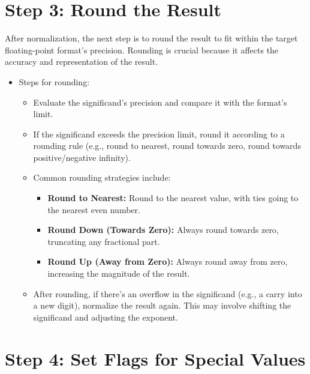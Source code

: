 \documentclass[12pt,openany]{book}
\begin{document}
			      	\section*{Step 3: Round the Result}
			      	
			      	After normalization, the next step is to round the result to fit within the target floating-point format's precision. Rounding is crucial because it affects the accuracy and representation of the result.
			      	    
			      	\begin{itemize}
			      		\item[] Steps for rounding:
			      		      \begin{itemize}
			      		      	\item Evaluate the significand's precision and compare it with the format's limit.
			      		      	\item If the significand exceeds the precision limit, round it according to a rounding rule (e.g., round to nearest, round towards zero, round towards positive/negative infinity).
			      		      	\item Common rounding strategies include:
			      		      	      \begin{itemize}
			      		      	      	\item \textbf{Round to Nearest:} Round to the nearest value, with ties going to the nearest even number.
			      		      	      	\item \textbf{Round Down (Towards Zero):} Always round towards zero, truncating any fractional part.
			      		      	      	\item \textbf{Round Up (Away from Zero):} Always round away from zero, increasing the magnitude of the result.
			      		      	      \end{itemize}
			      		      	\item After rounding, if there's an overflow in the significand (e.g., a carry into a new digit), normalize the result again. This may involve shifting the significand and adjusting the exponent.
			      		      \end{itemize}
			      	\end{itemize}
			      	    
			      	\section*{Step 4: Set Flags for Special Values}
			      	    
\end{document}
